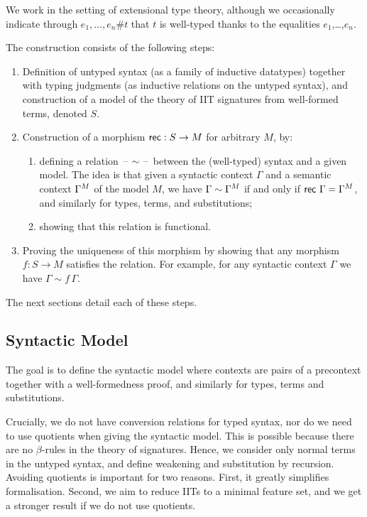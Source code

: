 

We work in the setting of extensional type theory, although we occasionally indicate through $e_1,\dots,e_n \#
t$ that $t$ is well-typed thanks to the equalities $e_1$,\dots,$e_n$.

The construction consists of the following steps:
\begin{enumerate}
\item Definition of untyped syntax (as a family of inductive datatypes) together
  with typing judgments (as inductive relations on the untyped
  syntax), and construction of a model of the theory of IIT
  signatures from well-formed terms, denoted $S$.
\item Construction of a morphism $\mathsf{rec}:S\to M$ for arbitrary $M$, by:
  \begin{enumerate}
  \item defining a relation $\mathord{\hspace{1pt}\text{--}\hspace{1pt}} \sim \mathord{\hspace{1pt}\text{--}\hspace{1pt}}$ between the (well-typed) syntax and a given
    model. The idea is that given a syntactic context $\Gamma$ and a semantic
    context ${\Gamma}^M$ of the model $M$, we have $\Gamma \sim
    {\Gamma}^M$ if and only if $\mathsf{rec}\,\,\Gamma = {\Gamma}^M$, and
    similarly for types, terms, and substitutions;
  \item showing that this relation is functional.
    \end{enumerate}
  \item Proving the uniqueness of this morphism by showing that any morphism
    $f:S\to M$ satisfies the relation. For example, for any syntactic context
    $\Gamma$ we have $\Gamma\sim f\,\Gamma$.
\end{enumerate}
The next sections detail each of these steps.
\subsection{Syntactic Model}

The goal is to define the syntactic model where contexts are pairs of a
precontext together with a well-formedness proof, and similarly for types, terms
and substitutions.

Crucially, we do not have conversion relations for typed syntax, nor do we need
to use quotients when giving the syntactic model. This is possible because there
are no $\beta$-rules in the theory of signatures. Hence, we consider only normal
terms in the untyped syntax, and define weakening and substitution by recursion.
Avoiding quotients is important for two reasons. First, it greatly simplifies
formalisation. Second, we aim to reduce IITs to a minimal feature set, and we
get a stronger result if we do not use quotients.

